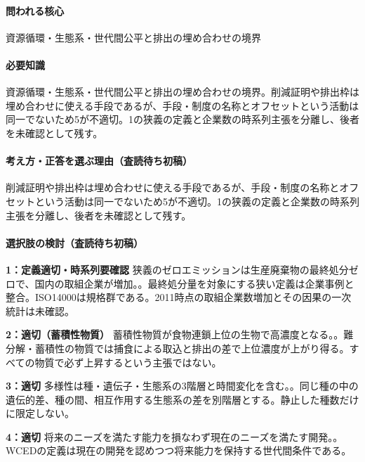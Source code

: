 \paragraph{問われる核心} 資源循環・生態系・世代間公平と排出の埋め合わせの境界

\paragraph{必要知識} 資源循環・生態系・世代間公平と排出の埋め合わせの境界。削減証明や排出枠は埋め合わせに使える手段であるが、手段・制度の名称とオフセットという活動は同一でないため5が不適切。1の狭義の定義と企業数の時系列主張を分離し、後者を未確認として残す。

\paragraph{考え方・正答を選ぶ理由（査読待ち初稿）} 削減証明や排出枠は埋め合わせに使える手段であるが、手段・制度の名称とオフセットという活動は同一でないため5が不適切。1の狭義の定義と企業数の時系列主張を分離し、後者を未確認として残す。

\paragraph{選択肢の検討（査読待ち初稿）}\mbox{}\par

\noindent\textbf{1：定義適切・時系列要確認} 狭義のゼロエミッションは生産廃棄物の最終処分ゼロで、国内の取組企業が増加。。最終処分量を対象にする狭い定義は企業事例と整合。ISO14000は規格群である。2011時点の取組企業数増加とその因果の一次統計は未確認。\par

\noindent\textbf{2：適切（蓄積性物質）} 蓄積性物質が食物連鎖上位の生物で高濃度となる。。難分解・蓄積性の物質では捕食による取込と排出の差で上位濃度が上がり得る。すべての物質で必ず上昇するという主張ではない。\par

\noindent\textbf{3：適切} 多様性は種・遺伝子・生態系の3階層と時間変化を含む。。同じ種の中の遺伝的差、種の間、相互作用する生態系の差を別階層とする。静止した種数だけに限定しない。\par

\noindent\textbf{4：適切} 将来のニーズを満たす能力を損なわず現在のニーズを満たす開発。。WCEDの定義は現在の開発を認めつつ将来能力を保持する世代間条件である。\par


